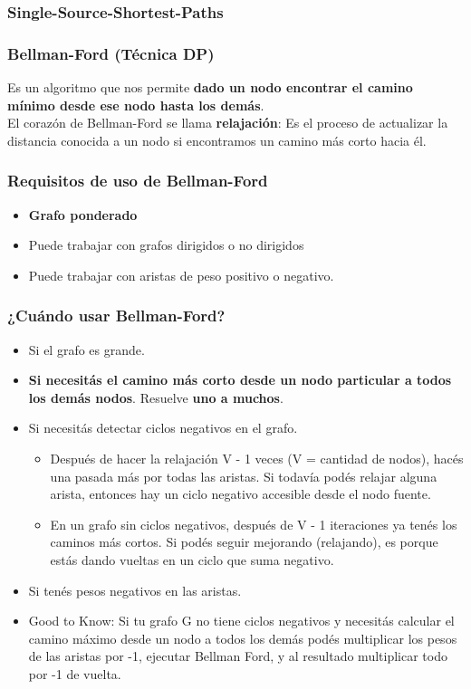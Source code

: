\documentclass[10pt,a4paper]{article}
\begin{document}
\subsubsection*{Single-Source-Shortest-Paths}
\subsubsection*{Bellman-Ford (Técnica DP)}
Es un algoritmo que nos permite \textbf{dado un nodo encontrar el camino mínimo desde ese nodo hasta los demás}. \\
El corazón de Bellman-Ford se llama \textbf{relajación}: Es el proceso de actualizar la distancia conocida a un nodo si encontramos un camino más corto hacia él. 
\subsubsection*{Requisitos de uso de Bellman-Ford}
\begin{itemize}
    \item \textbf{Grafo ponderado}
    \item Puede trabajar con grafos dirigidos o no dirigidos 
    \item Puede trabajar con aristas de peso positivo o negativo.
\end{itemize}
\subsubsection*{¿Cuándo usar Bellman-Ford?}
\begin{itemize}
    \item Si el grafo es grande. 
    \item \textbf{Si necesitás el camino más corto desde un nodo particular a todos los demás nodos}. Resuelve \textbf{uno a muchos}.
    \item Si necesitás detectar ciclos negativos en el grafo.
    \begin{itemize}
        \item Después de hacer la relajación V - 1 veces (V = cantidad de nodos), hacés una pasada más por todas las aristas. Si todavía podés relajar alguna arista, entonces hay un ciclo negativo accesible desde el nodo fuente.
        \item En un grafo sin ciclos negativos, después de V - 1 iteraciones ya tenés los caminos más cortos. Si podés seguir mejorando (relajando), es porque estás dando vueltas en un ciclo que suma negativo.
    \end{itemize}
    \item Si tenés pesos negativos en las aristas.
    \item Good to Know: Si tu grafo G no tiene ciclos negativos y necesitás calcular el camino máximo desde un nodo a todos los demás podés multiplicar los pesos de las aristas por -1, ejecutar Bellman Ford, y al resultado multiplicar todo por -1 de vuelta.
\end{itemize}
\end{document}
